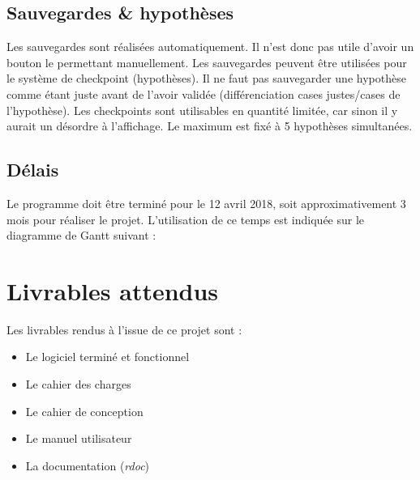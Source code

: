 \documentclass{report}
\begin{document}
	\section{Sauvegardes \& hypothèses}
		Les sauvegardes sont réalisées automatiquement. Il n'est donc pas utile d'avoir un bouton le permettant manuellement. Les sauvegardes peuvent être utilisées pour le système de checkpoint (hypothèses). Il ne faut pas sauvegarder une hypothèse comme étant juste avant de l'avoir validée (différenciation cases justes/cases de l'hypothèse). Les checkpoints sont utilisables en quantité limitée, car sinon il y aurait un désordre à l'affichage. Le maximum est fixé à 5 hypothèses simultanées.
	
	\section{Délais}
		Le programme doit être terminé pour le 12 avril 2018, soit approximativement 3 mois pour réaliser le projet. L'utilisation de ce temps est indiquée sur le diagramme de Gantt suivant :


		
		
\chapter{Livrables attendus}
	Les livrables rendus à l'issue de ce projet sont :
	\begin{itemize}
	\item Le logiciel terminé et fonctionnel
	\item Le cahier des charges
	\item Le cahier de conception
	\item Le manuel utilisateur
	\item La documentation (\textit{rdoc})
	\end{itemize}
		
		
		
\end{document}
